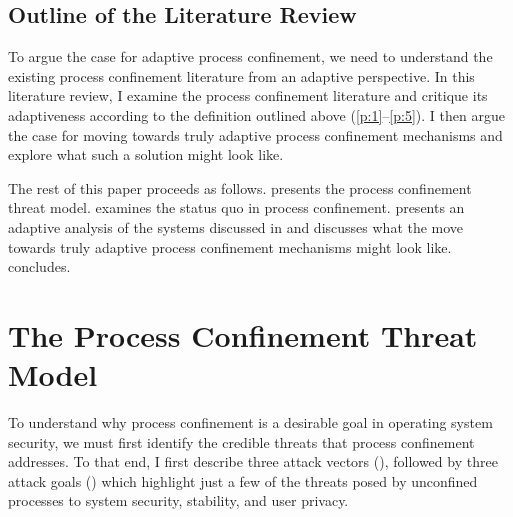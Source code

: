 \documentclass[dvipsnames, 12pt]{article}
\begin{document}
\subsection{Outline of the Literature Review}

To argue the case for adaptive process confinement, we need to understand the
existing process confinement literature from an adaptive perspective. In this
literature review, I examine the process confinement literature and critique its
adaptiveness according to the definition outlined above (\ref{p:1}--\ref{p:5}).
I then argue the case for moving towards truly adaptive process confinement
mechanisms and explore what such a solution might look like.

The rest of this paper proceeds as follows.  presents the
process confinement threat model.   examines the status quo
in process confinement.   presents an adaptive analysis of the
systems discussed in  and discusses what the move towards
truly adaptive process confinement mechanisms might look like.
 concludes.

\section{The Process Confinement Threat Model}
\label{sec:threat_model}

To understand why process confinement is a desirable goal in operating system
security, we must first identify the credible threats that process confinement
addresses. To that end, I first describe three attack vectors
(), followed by three attack goals ()
which highlight just a few of the threats posed by unconfined processes to
system security, stability, and user privacy.
\end{document}
